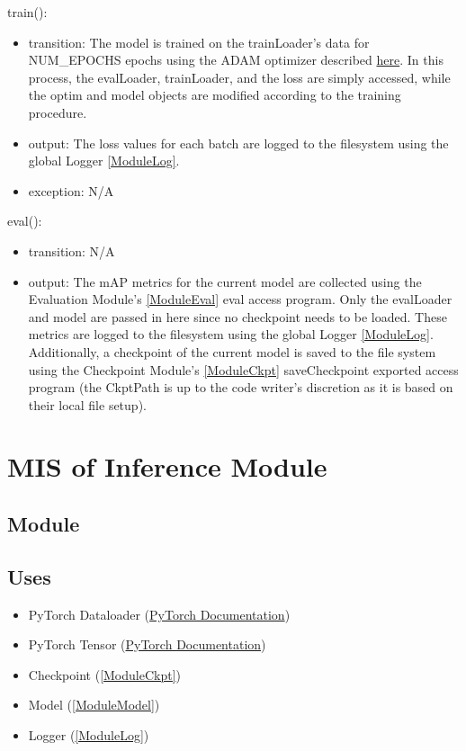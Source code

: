 \documentclass[12pt, titlepage]{article}
\begin{document}
\noindent train():
\begin{itemize}
\item transition: The model is trained on the trainLoader's data for NUM\_EPOCHS epochs using the ADAM optimizer described \href{https://arxiv.org/abs/1412.6980}{here}. In this process, the evalLoader, trainLoader, and the loss are simply accessed, while the optim and model objects are modified according to the training procedure.
\item output: The loss values for each batch are logged to the filesystem using the global Logger \ref{ModuleLog}.
\item exception: N/A
\end{itemize}

\noindent eval():
\begin{itemize}
  \item transition: N/A
  \item output: The mAP metrics for the current model are collected using the Evaluation Module's \ref{ModuleEval} eval access program. Only the evalLoader and model are passed in here since no checkpoint needs to be loaded. These metrics are logged to the filesystem using the global Logger \ref{ModuleLog}. Additionally, a checkpoint of the current model is saved to the file system using the Checkpoint Module's \ref{ModuleCkpt} saveCheckpoint exported access program (the CkptPath is up to the code writer's discretion as it is based on their local file setup).
\end{itemize}

\newpage

\section{MIS of Inference Module} \label{ModuleInfer} 

\subsection{Module}



\subsection{Uses}
\begin{itemize}
  \item PyTorch Dataloader (\href{https://pytorch.org/tutorials/beginner/basics/data_tutorial.html}{PyTorch Documentation})
  \item PyTorch Tensor (\href{https://pytorch.org/docs/stable/tensors.html}{PyTorch Documentation})
  \item Checkpoint (\ref{ModuleCkpt})
  \item Model (\ref{ModuleModel})
  \item Logger (\ref{ModuleLog})
\end{itemize}
\end{document}
